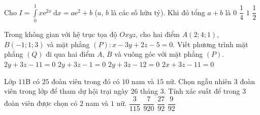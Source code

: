 \begin{ex}%
	Cho $\displaystyle I = \int\limits_0^1 x\mathrm{e}^{2x}\ \mathrm{d}x = a\mathrm{e}^2+b$ ($a$, $b$ là các số hữu tỷ). Khi đó tổng $a+b$ là
	\choice
	{$0$}
	{$\dfrac{1}{4}$}
	{$1$}
	{\True $\dfrac{1}{2}$}
\end{ex}
\begin{ex}%
	Trong không gian với hệ trục tọa độ $Oxyz$, cho hai điểm $A(2;4;1)$, $B(-1;1;3)$ và mặt phẳng $(P):x-3y+2z-5=0$. Viết phương trình mặt phẳng $(Q)$ đi qua hai điểm $A$, $B$ và vuông góc với mặt phẳng $(P)$.
	\choice
	{{\True $2y+3z-11=0$}}
	{$2y+3z-1=0$}
	{$2y+3z-12=0$}
	{$2x+3z-11=0$}
\end{ex}
\begin{ex}%
	Lớp $11$B có $25$ đoàn viên trong đó có $10$ nam và $15$ nữ. Chọn ngẫu nhiên $3$ đoàn viên trong lớp để tham dự hội trại ngày $26$ tháng $3$. Tính xác suất để trong $3$ đoàn viên được chọn có $2$ nam và $1$ nữ.
	\choice
	{$\dfrac{3}{115}$}
	{$\dfrac{7}{920}$}
	{\True $\dfrac{27}{92}$}
	{$\dfrac{9}{92}$}
\end{ex}
